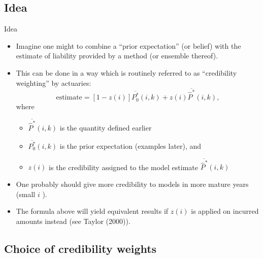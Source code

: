 \documentclass[
  ignorenonframetext,
  t,handout]{beamer}
\providecommand{\tightlist}{%
  \setlength{\itemsep}{0pt}\setlength{\parskip}{0pt}}
\begin{document}
\subsection{Idea}\label{idea-1}

\begin{frame}{Idea}
\begin{itemize}
\tightlist
\item
  Imagine one might to combine a ``prior expectation'' (or belief) with
  the estimate of liability provided by a method (or ensemble thereof).
\item
  This can be done in a way which is routinely referred to as
  ``credibility weighting'' by actuaries:
  \[ \text{estimate} = [1-z(i)] \overline{P_0^*}(i,k) + z(i) \overline{\hat{P}^*}(i,k),\]
  where

  \begin{itemize}
  \tightlist
  \item
    \(\overline{\hat{P}^*}(i,k)\) is the quantity defined earlier
  \item
    \(\overline{P_0^*}(i,k)\) is the prior expectation (examples later),
    and
  \item
    \(z(i)\) is the credibility assigned to the model estimate
    \(\overline{\hat{P}^*}(i,k)\)
  \end{itemize}
\item
  One probably should give more credibility to models in more mature
  years (small \(i\) ).
\item
  The formula above will yield equivalent results if \(z(i)\) is applied
  on incurred amounts instead (see Taylor (2000)).
\end{itemize}
\end{frame}

\subsection{Choice of credibility
weights}\label{choice-of-credibility-weights}
\end{document}
